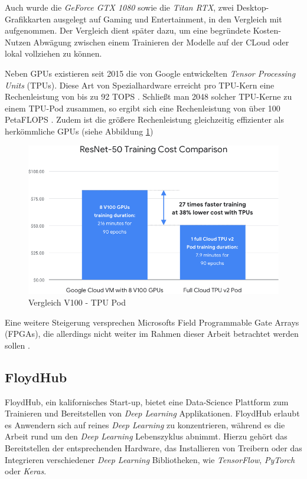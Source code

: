 Auch wurde die \textit{GeForce GTX 1080} sowie die \textit{Titan RTX}, zwei Desktop-Grafikkarten ausgelegt auf Gaming und Entertainment, in den Vergleich mit aufgenommen. Der Vergleich dient später dazu, um eine begründete Kosten-Nutzen Abwägung zwischen einem Trainieren der Modelle auf der CLoud oder lokal vollziehen zu können.

Neben GPUs existieren seit 2015 die von Google entwickelten \textit{Tensor Processing Units} (TPUs). Diese Art von Spezialhardware erreicht pro TPU-Kern eine Rechenleistung von bis zu 92 TOPS \cite{HaraldBogeholz.20170406}. Schließt man 2048 solcher TPU-Kerne zu einem TPU-Pod zusammen, so ergibt sich eine Rechenleistung von über 100 PetaFLOPS \cite{GoogleCloud.20200209}. Zudem ist die größere Rechenleistung gleichzeitig effizienter als herkömmliche GPUs (siehe Abbildung \ref{tpu})

\begin{figure}[ht]
	\begin{center}
		\includegraphics[width=14cm]{Bilder/tpu_comparison.png} 
		\caption[Vergleich V100 - TPU Pod]{Vergleich V100 - TPU Pod \cite{GoogleCloud.20200209b}}
		\label{tpu}
	\end{center}
\end{figure}

Eine weitere Steigerung versprechen Microsofts Field Programmable Gate Arrays (FPGAs), die allerdings nicht weiter im Rahmen dieser Arbeit betrachtet werden sollen \cite{KarlFreund.20170828}.

\subsection*{FloydHub}

FloydHub, ein kalifornisches Start-up, bietet eine Data-Science Plattform zum Trainieren und Bereitstellen von \textit{Deep Learning} Applikationen. FloydHub erlaubt es Anwendern sich auf reines \textit{Deep Learning} zu konzentrieren, während es die Arbeit rund um den \textit{Deep Learning} Lebenszyklus abnimmt. Hierzu gehört das Bereitstellen der entsprechenden Hardware, das Installieren von Treibern oder das Integrieren verschiedener \textit{Deep Learning} Bibliotheken, wie \textit{TensorFlow}, \textit{PyTorch} oder \textit{Keras}. \cite{FloydHub.20200215}

